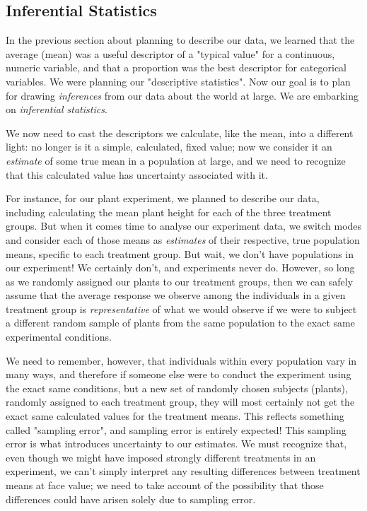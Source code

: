 \documentclass[
]{book}
\begin{document}
\hypertarget{inferential-statistics}{%
\subsection*{Inferential Statistics}\label{inferential-statistics}}

In the previous section about planning to describe our data, we learned that the average (mean) was a useful descriptor of a "typical value" for a continuous, numeric variable, and that a proportion was the best descriptor for categorical variables. We were planning our "descriptive statistics". Now our goal is to plan for drawing \emph{inferences} from our data about the world at large. We are embarking on \emph{inferential statistics}.

We now need to cast the descriptors we calculate, like the mean, into a different light: no longer is it a simple, calculated, fixed value; now we consider it an \emph{estimate} of some true mean in a population at large, and we need to recognize that this calculated value has uncertainty associated with it.

For instance, for our plant experiment, we planned to describe our data, including calculating the mean plant height for each of the three treatment groups. But when it comes time to analyse our experiment data, we switch modes and consider each of those means as \emph{estimates} of their respective, true population means, specific to each treatment group. But wait, we don't have populations in our experiment! We certainly don't, and experiments never do. However, so long as we randomly assigned our plants to our treatment groups, then we can safely assume that the average response we observe among the individuals in a given treatment group is \emph{representative} of what we would observe if we were to subject a different random sample of plants from the same population to the exact same experimental conditions.

We need to remember, however, that individuals within every population vary in many ways, and therefore if someone else were to conduct the experiment using the exact same conditions, but a new set of randomly chosen subjects (plants), randomly assigned to each treatment group, they will most certainly not get the exact same calculated values for the treatment means. This reflects something called "sampling error", and sampling error is entirely expected! This sampling error is what introduces uncertainty to our estimates. We must recognize that, even though we might have imposed strongly different treatments in an experiment, we can't simply interpret any resulting differences between treatment means at face value; we need to take account of the possibility that those differences could have arisen solely due to sampling error.
\end{document}
